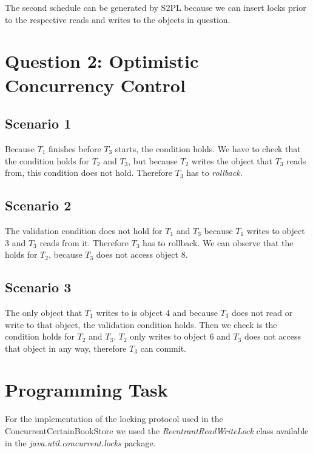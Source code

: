 \documentclass{article}      %
\begin{document}
The second schedule can be generated by S2PL because we can insert locks prior to the respective reads and writes to the objects in question.

\section*{Question 2: Optimistic Concurrency Control}

\subsection*{Scenario 1}

Because $T_1$ finishes before $T_3$ starts, the  condition holds. We have to check that the  condition holds for $T_2$ and $T_3$, but because $T_2$ writes the object that $T_3$ reads from, this condition does not hold. Therefore $T_3$ has to \emph{rollback}.\\

\subsection*{Scenario 2}

The  validation condition does not hold for $T_1$ and $T_3$ because $T_1$ writes to object 3 and $T_3$ reads from it. Therefore $T_3$ has to rollback. We can observe that the  holds for $T_2$, because $T_3$ does not access object 8.\\

\subsection*{Scenario 3}

The only object that $T_1$ writes to is object 4 and because $T_3$ does not read or write to that object, the  validation condition holds. Then we check is the  condition holds for $T_2$ and $T_3$. $T_2$ only writes to object 6 and $T_3$ does not access that object in any way, therefore $T_3$ can commit.\\

\section*{Programming Task}

For the implementation of the locking protocol used in the ConcurrentCertainBookStore we used the \emph{ReentrantReadWriteLock} class available in the \emph{java.util.concurrent.locks} package. \\
\end{document}

